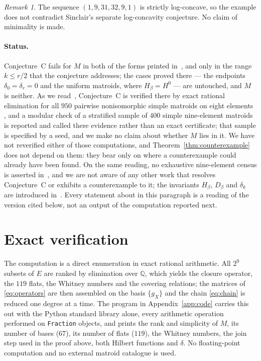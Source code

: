 \documentclass[11pt]{amsart}
\theoremstyle{remark}
\newtheorem{remark}[theorem]{Remark}
\begin{document}
\begin{remark}
The sequence $(1,9,31,32,9,1)$ is strictly log-concave, so the example does
not contradict Sinclair's separate log-concavity conjecture. No claim of
minimality is made.
\end{remark}

\paragraph{Status.}
Conjecture~C fails for $M$ in both of the forms printed
in~\cite{Sinclair}, and only in the range $k\leq r/2$ that the conjecture
addresses; the cases proved there --- the endpoints $\delta_0=\delta_r=0$ and
the uniform matroids, where $H_\beta=H^0$ --- are untouched, and $M$ is
neither. As we read~\cite{Sinclair}, Conjecture~C is verified there by exact
rational elimination for all $950$ pairwise nonisomorphic simple matroids on
eight elements \cite[Prop.~5.1]{Sinclair}, and a modular check of a stratified
sample of $400$ simple nine-element matroids is reported
\cite[Sec.~5]{Sinclair} and called there evidence rather than an exact
certificate; that sample is specified by a seed, and we make no claim about
whether $M$ lies in it. We have not reverified either of those computations,
and Theorem~\ref{thm:counterexample} does not depend on them: they bear only
on where a counterexample could already have been found. On the same reading,
no exhaustive nine-element census is asserted in~\cite{Sinclair}, and we are
not aware of any other work that resolves Conjecture~C or exhibits a
counterexample to it; the invariants $H_\beta$, $D_\beta$ and $\delta_k$ are
introduced in~\cite{Sinclair}. Every statement about \cite{Sinclair} in this
paragraph is a reading of the version cited below, not an output of the
computation reported next.

\section*{Exact verification}

The computation is a direct enumeration in exact rational arithmetic. All
$2^9$ subsets of $E$ are ranked by elimination over $\mathbb Q$, which yields
the closure operator, the $119$ flats, the Whitney numbers and the covering
relations; the matrices of \eqref{eq:operators} are then assembled on the
basis $\{g_X\}$ and the chain \eqref{eq:chain} is reduced one degree at a
time. The program in Appendix~\ref{app:code} carries this out with the Python
standard library alone, every arithmetic operation performed on
\texttt{Fraction} objects, and prints the rank and simplicity of $M$, its
number of bases ($67$), its number of flats ($119$), the Whitney numbers,
the join step used in the proof above, both Hilbert functions and $\delta$.
No floating-point computation and no external matroid catalogue is used.
\end{document}
